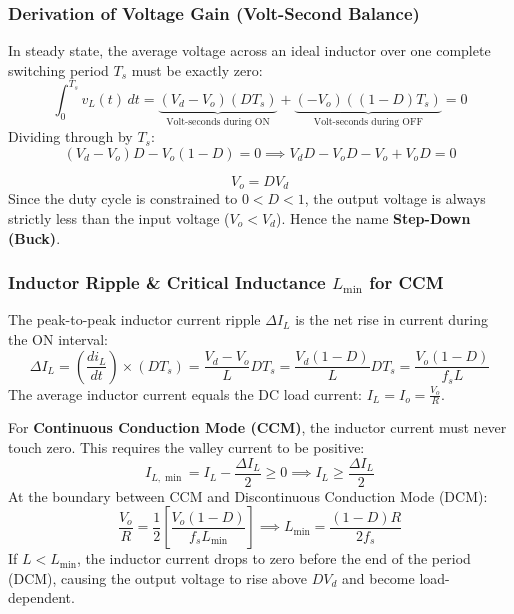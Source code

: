 \documentclass[11pt,a4paper]{article}
\renewcommand{\boxed}[1]{#1}
\begin{document}
\subsubsection{Derivation of Voltage Gain (Volt-Second Balance)}
In steady state, the average voltage across an ideal inductor over one complete switching period $T_s$ must be exactly zero:
\[
\int_{0}^{T_s} v_L(t) \, dt = \underbrace{(V_d - V_o)(D T_s)}_{\text{Volt-seconds during ON}} + \underbrace{(-V_o)((1 - D) T_s)}_{\text{Volt-seconds during OFF}} = 0
\]
Dividing through by $T_s$:
\[
(V_d - V_o)D - V_o(1 - D) = 0 \implies V_d D - V_o D - V_o + V_o D = 0
\]
\begin{formulabox}
\[
\boxed{V_o = D V_d}
\]
Since the duty cycle is constrained to $0 < D < 1$, the output voltage is always strictly less than the input voltage ($V_o < V_d$). Hence the name \textbf{Step-Down (Buck)}.
\end{formulabox}

\subsubsection{Inductor Ripple \& Critical Inductance \texorpdfstring{$L_{\min}$}{Lmin} for CCM}
The peak-to-peak inductor current ripple $\Delta I_L$ is the net rise in current during the ON interval:
\[
\Delta I_L = \left(\frac{di_L}{dt}\right) \times (D T_s) = \frac{V_d - V_o}{L} D T_s = \frac{V_d(1 - D)}{L} D T_s = \boxed{\frac{V_o (1 - D)}{f_s L}}
\]
The average inductor current equals the DC load current: $I_L = I_o = \frac{V_o}{R}$. 

For \textbf{Continuous Conduction Mode (CCM)}, the inductor current must never touch zero. This requires the valley current to be positive:
\[
I_{L,\min} = I_L - \frac{\Delta I_L}{2} \ge 0 \implies I_L \ge \frac{\Delta I_L}{2}
\]
At the boundary between CCM and Discontinuous Conduction Mode (DCM):
\[
\frac{V_o}{R} = \frac{1}{2} \left[ \frac{V_o (1 - D)}{f_s L_{\min}} \right] \implies \boxed{L_{\min} = \frac{(1 - D) R}{2 f_s}}
\]
If $L < L_{\min}$, the inductor current drops to zero before the end of the period (DCM), causing the output voltage to rise above $D V_d$ and become load-dependent.
\end{document}
